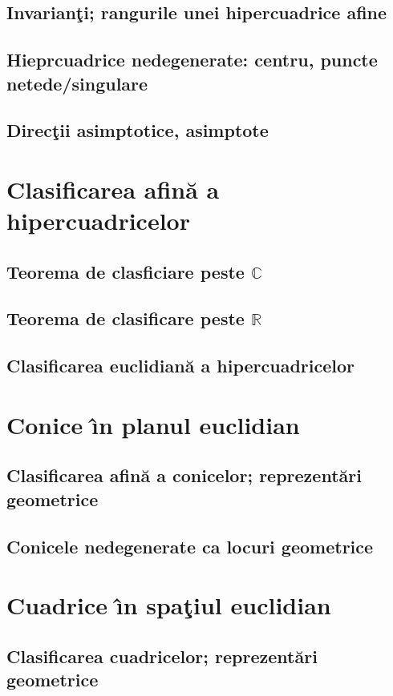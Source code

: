 \documentclass[12pt]{book}
\def\C{\mathbb C}
\def\R{\mathbb R}
\begin{document}
\subsection{Invarian\c ti; rangurile unei hipercuadrice afine}
\subsection{Hieprcuadrice nedegenerate: centru, puncte netede/singulare}
\subsection{Direc\c tii asimptotice, asimptote}

\section{Clasificarea afin\u a a hipercuadricelor}
\subsection{Teorema  de clasficiare peste $\C$}
\subsection{Teorema de clasificare peste $\R$}

\subsection{Clasificarea euclidian\u a a hipercuadricelor}


\section{Conice \^{\i}n planul euclidian}
\subsection{Clasificarea afin\u a a conicelor; reprezent\u ari geometrice}
\subsection{Conicele nedegenerate ca locuri geometrice}

\section{Cuadrice \^{\i}n spa\c tiul euclidian}
\subsection{Clasificarea cuadricelor; reprezent\u ari geometrice}
\end{document}
